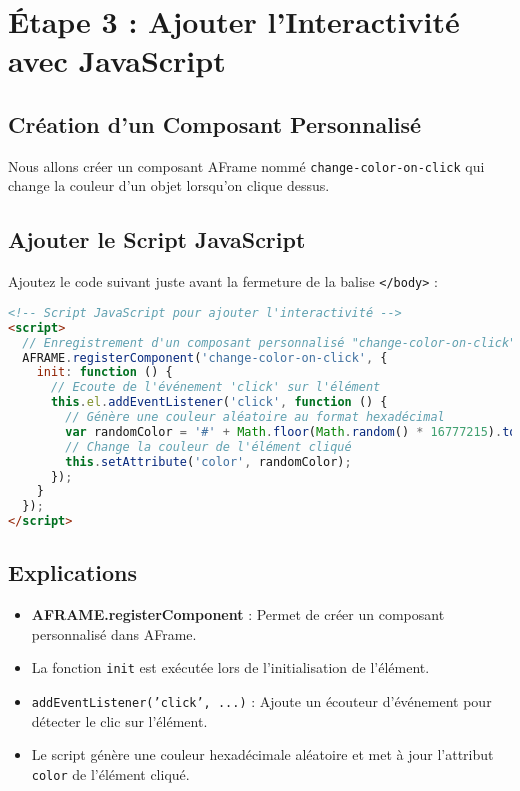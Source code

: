 \documentclass[12pt]{article}
\begin{document}
\section{Étape 3 : Ajouter l'Interactivité avec JavaScript}
\subsection{Création d'un Composant Personnalisé}
Nous allons créer un composant AFrame nommé \texttt{change-color-on-click} qui change la couleur d'un objet lorsqu'on clique dessus.

\subsection{Ajouter le Script JavaScript}
Ajoutez le code suivant juste avant la fermeture de la balise \texttt{</body>} :

\begin{lstlisting}[language=HTML]
<!-- Script JavaScript pour ajouter l'interactivité -->
<script>
  // Enregistrement d'un composant personnalisé "change-color-on-click"
  AFRAME.registerComponent('change-color-on-click', {
    init: function () {
      // Ecoute de l'événement 'click' sur l'élément
      this.el.addEventListener('click', function () {
        // Génère une couleur aléatoire au format hexadécimal
        var randomColor = '#' + Math.floor(Math.random() * 16777215).toString(16);
        // Change la couleur de l'élément cliqué
        this.setAttribute('color', randomColor);
      });
    }
  });
</script>
\end{lstlisting}

\subsection{Explications}
\begin{itemize}
    \item \textbf{AFRAME.registerComponent} : Permet de créer un composant personnalisé dans AFrame.
    \item La fonction \texttt{init} est exécutée lors de l'initialisation de l'élément.
    \item \texttt{addEventListener('click', ...)} : Ajoute un écouteur d'événement pour détecter le clic sur l'élément.
    \item Le script génère une couleur hexadécimale aléatoire et met à jour l'attribut \texttt{color} de l'élément cliqué.
\end{itemize}
\end{document}
